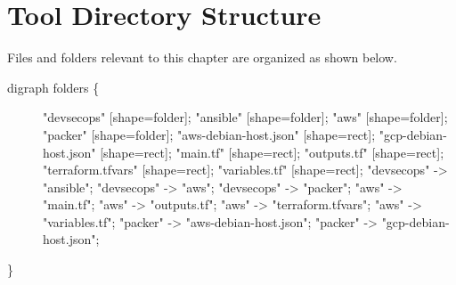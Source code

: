 \begin{Shaded}
   \begin{Highlighting}[]
   \end{Highlighting}
\end{Shaded}

\clearpage

\section{Tool Directory Structure}

Files and folders relevant to this chapter are organized as shown below.

\begin{description}
   \item[digraph folders \{]
         "devsecops" {[}shape=folder{]}; "ansible" {[}shape=folder{]}; "aws"
         {[}shape=folder{]}; "packer" {[}shape=folder{]}; "aws-debian-host.json"
         {[}shape=rect{]}; "gcp-debian-host.json" {[}shape=rect{]}; "main.tf"
         {[}shape=rect{]}; "outputs.tf" {[}shape=rect{]}; "terraform.tfvars"
         {[}shape=rect{]}; "variables.tf" {[}shape=rect{]}; "devsecops"
         -\textgreater{} "ansible"; "devsecops" -\textgreater{} "aws";
         "devsecops" -\textgreater{} "packer"; "aws" -\textgreater{} "main.tf";
         "aws" -\textgreater{} "outputs.tf"; "aws" -\textgreater{}
         "terraform.tfvars"; "aws" -\textgreater{} "variables.tf"; "packer"
         -\textgreater{} "aws-debian-host.json"; "packer" -\textgreater{}
         "gcp-debian-host.json";
\end{description}

\}
